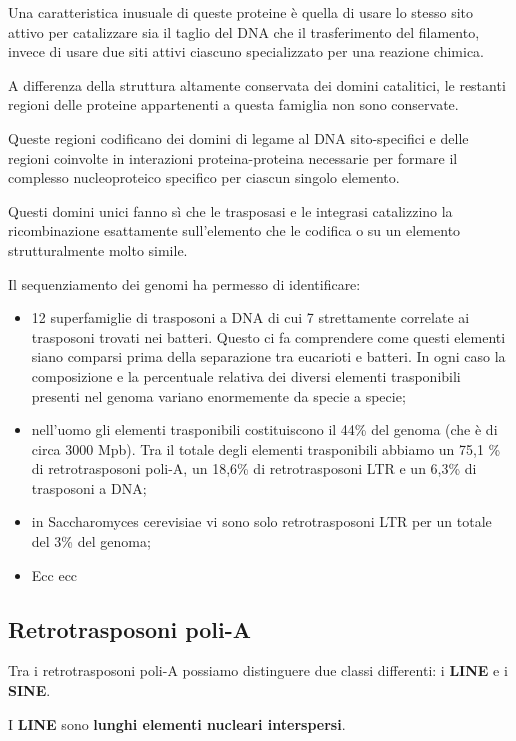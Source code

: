 \documentclass[]{article}
\begin{document}
Una caratteristica inusuale di queste proteine è quella di usare lo
stesso sito attivo per catalizzare sia il taglio del DNA che il
trasferimento del filamento, invece di usare due siti attivi ciascuno
specializzato per una reazione chimica.

A differenza della struttura altamente conservata dei domini catalitici,
le restanti regioni delle proteine appartenenti a questa famiglia non
sono conservate.

Queste regioni codificano dei domini di legame al DNA sito-specifici e
delle regioni coinvolte in interazioni proteina-proteina necessarie per
formare il complesso nucleoproteico specifico per ciascun singolo
elemento.

Questi domini unici fanno sì che le trasposasi e le integrasi
catalizzino la ricombinazione esattamente sull'elemento che le codifica
o su un elemento strutturalmente molto simile.

Il sequenziamento dei genomi ha permesso di identificare:

\begin{itemize}
\itemsep1pt\parskip0pt
\item
  12 superfamiglie di trasposoni a DNA di cui 7 strettamente correlate
  ai trasposoni trovati nei batteri. Questo ci fa comprendere come
  questi elementi siano comparsi prima della separazione tra eucarioti e
  batteri. In ogni caso la composizione e la percentuale relativa dei
  diversi elementi trasponibili presenti nel genoma variano enormemente
  da specie a specie;
\item
  nell'uomo gli elementi trasponibili costituiscono il 44\% del genoma
  (che è di circa 3000 Mpb). Tra il totale degli elementi trasponibili
  abbiamo un 75,1 \% di retrotrasposoni poli-A, un 18,6\% di
  retrotrasposoni LTR e un 6,3\% di trasposoni a DNA;
\item
  in Saccharomyces cerevisiae vi sono solo retrotrasposoni LTR per un
  totale del 3\% del genoma;
\item
  Ecc ecc
\end{itemize}

\subsection{Retrotrasposoni poli-A}\label{retrotrasposoni-poli-a-1}

Tra i retrotrasposoni poli-A possiamo distinguere due classi differenti:
i \textbf{LINE} e i \textbf{SINE}.

I \textbf{LINE} sono \textbf{lunghi elementi nucleari interspersi}.
\end{document}
